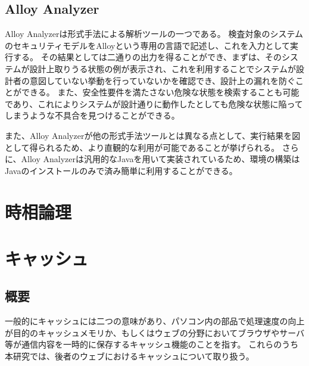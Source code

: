 \subsection{Alloy Analyzer}
Alloy Analyzerは形式手法による解析ツールの一つである。
検査対象のシステムのセキュリティモデルをAlloyという専用の言語で記述し、これを入力として実行する。
その結果としては二通りの出力を得ることができ、まずは、そのシステムが設計上取りうる状態の例が表示され、これを利用することでシステムが設計者の意図していない挙動を行っていないかを確認でき、設計上の漏れを防ぐことができる。
また、安全性要件を満たさない危険な状態を検索することも可能であり、これによりシステムが設計通りに動作したとしても危険な状態に陥ってしまうような不具合を見つけることができる。

また、Alloy Analyzerが他の形式手法ツールとは異なる点として、実行結果を図として得られるため、より直観的な利用が可能であることが挙げられる。
さらに、Alloy Analyzerは汎用的なJavaを用いて実装されているため、環境の構築はJavaのインストールのみで済み簡単に利用することができる。

\section{時相論理}
\label{sec:TemporalLogic}






\section{キャッシュ}
\subsection{概要}
一般的にキャッシュには二つの意味があり、パソコン内の部品で処理速度の向上が目的のキャッシュメモリか、もしくはウェブの分野においてブラウザやサーバ等が通信内容を一時的に保存するキャッシュ機能のことを指す。
これらのうち本研究では、後者のウェブにおけるキャッシュについて取り扱う。

